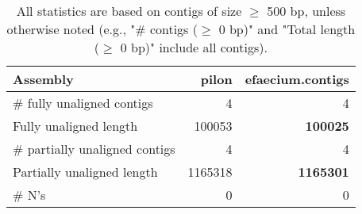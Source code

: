 \documentclass[12pt,a4paper]{article}
\begin{document}
\begin{table}[ht]
\begin{center}
\caption{All statistics are based on contigs of size $\geq$ 500 bp, unless otherwise noted (e.g., "\# contigs ($\geq$ 0 bp)" and "Total length ($\geq$ 0 bp)" include all contigs).}
\begin{tabular}{|l*{2}{|r}|}
\hline
Assembly & pilon & efaecium.contigs \\ \hline
\# fully unaligned contigs & 4 & 4 \\ \hline
Fully unaligned length & 100053 & {\bf 100025} \\ \hline
\# partially unaligned contigs & 4 & 4 \\ \hline
Partially unaligned length & 1165318 & {\bf 1165301} \\ \hline
\# N's & 0 & 0 \\ \hline
\end{tabular}
\end{center}
\end{table}
\end{document}
